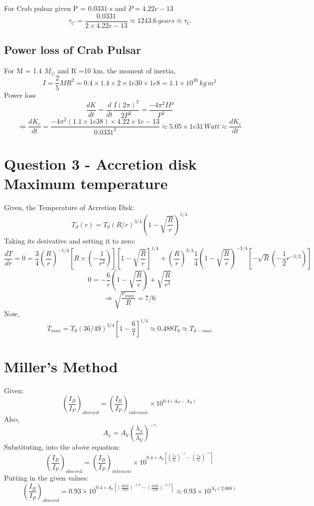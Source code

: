 \documentclass[11pt]{article}
\begin{document}
	For Crab pulsar given P = 0.0331 s and $\dot{P} = 4.22e-13$
	\[
		\tau_C = \frac{0.0331}{2 \times 4.22e-13} \approx \boxed{1243.6 \, years \approx \tau_C}
	\]
	
	\subsection{Power loss of Crab Pulsar}
	
	For M = 1.4 $M_\odot$ and R =10 km, the moment of inertia,
	\[
		I = \frac{2}{5}MR^2 = 0.4 \times 1.4 \times 2 \times 1e30 \times 1e8 = 1.1 \times 10^{38} \, kg \, m^2
	\]
	Power loss
	\[
		\frac{dK}{dt} = \frac{d}{dt} \frac{I(2\pi)^2}{2P^2} = \frac{-4\pi^2 I\dot{P}}{P^3}
	\]
	\[
		\Rightarrow \frac{dK_c}{dt} = \frac{-4\pi^2 (1.1 \times 1e38) \times 4.22 \times 1e-13}{0.0331^3} \approx \boxed{5.05 \times 1e31 \, Watt \approx \frac{dK_c}{dt}}
	\]
	
	\section{\color{teal} Question 3 - Accretion disk Maximum temperature}
	
	Given, the Temperature of Acrretion Disk:
	\[
		T_d(r) = T_0 (R/r)^{3/4}(1-\sqrt{\frac{R}{r}})^{1/4}
	\]
	Taking its derivative and setting it to zero:
	\[
		\frac{dT}{dr} = 0 = \frac{3}{4}(\frac{R}{r})^{-1/4}[R\times(-\frac{1}{r^2})][1-\sqrt{\frac{R}{r}}]^{1/4} + (\frac{R}{r})^{3/4}\frac{1}{4}(1-\sqrt{\frac{R}{r}})^{-3/4}[-\sqrt{R}(-\frac{1}{2}r^{-3/2})]
	\]
	\[
		0 = -\frac{6}{r}(1-\sqrt{\frac{R}{r}}) + \sqrt{\frac{R}{r^3}} 
	\]
	\[
		\Rightarrow \boxed{\sqrt{\frac{r_{max}}{R}} = 7/6}
	\]
	Now,
	\[
		T_{max} = T_0 (36/49)^{3/4}[1-\frac{6}{7}]^{1/4} \approx \boxed{0.488 T_0 \approx T_{d-max}}
	\] 
	
	\section{\color{teal} Miller's Method}
	
	Given:
	\[
		(\frac{I_B}{I_P})_{obseved} = (\frac{I_B}{I_P})_{intrinsic} \times 10^{0.4(A_P-A_B)} 
	\]
	Also,
	\[
		A_x = A_V (\frac{\lambda_x}{\lambda_V})^{-\gamma}
	\]
	Substituting, into the above equation:
	\[
		(\frac{I_B}{I_P})_{obseved} = (\frac{I_B}{I_P})_{intrinsic} \times 10^{0.4\times A_V[(\frac{\lambda_P}{\lambda_V})^{-\gamma}- (\frac{\lambda_B}{\lambda_V})^{-\gamma}]}
	\]
	Putting in the given values:
	\[
		(\frac{I_B}{I_P})_{obseved} = 0.93 \times 10^{0.4\times A_V[(\frac{4653}{550})^{-1.3}- (\frac{2166}{550})^{-1.3}]} \approx 0.93 \times 10^{A_V(2.068)}
	\]
	
\end{document}
